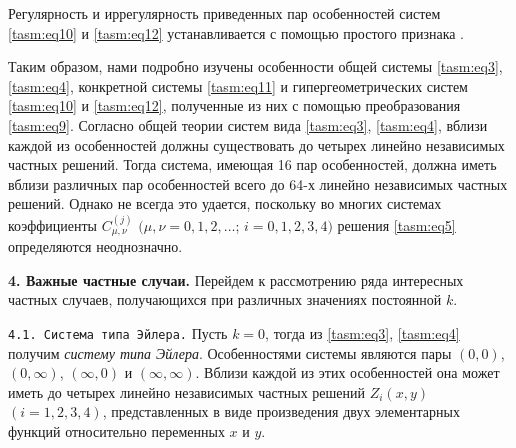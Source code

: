 Регулярность и иррегулярность приведенных пар особенностей систем \eqref{tasm:eq10} и \eqref{tasm:eq12} устанавливается с помощью простого признака \cite{tasm:4}. 

Таким образом, нами подробно изучены особенности общей системы \eqref{tasm:eq3}, \eqref{tasm:eq4}, конкретной системы \eqref{tasm:eq11} и гипергеометрических систем \eqref{tasm:eq10} и \eqref{tasm:eq12}, полученные из них с помощью преобразования \eqref{tasm:eq9}.
Согласно общей теории систем вида \eqref{tasm:eq3},  \eqref{tasm:eq4},  вблизи каждой из особенностей должны существовать до четырех линейно независимых частных решений. 
Тогда система, имеющая 16 пар особенностей, должна иметь вблизи различных пар особенностей всего до 64-х линейно независимых частных решений. Однако не всегда это удается, поскольку во многих системах коэффициенты 
$C^{(j)}_{\mu,\nu}$ $(\mu,\nu=0, 1, 2, \dots$; $i=0, 1, 2, 3, 4)$
решения \eqref{tasm:eq5} определяются неоднозначно.

\smallskip

\textbf{4.  Важные частные случаи.} 
Перейдем к рассмотрению ряда интересных частных случаев, получающихся при различных значениях
постоянной $k$.

\smallskip

\texttt{4.1. Система типа Эйлера.}  
Пусть $k=0$, тогда из \eqref{tasm:eq3}, \eqref{tasm:eq4} получим \emph{систему типа Эйлера}. 
Особенностями системы являются пары $(0, 0)$, $(0, \infty)$, $(\infty, 0)$ и $(\infty, \infty)$. 
Вблизи каждой из этих особенностей она может иметь до четырех линейно независимых частных решений $Z_{i}(x,y)$ $(i=1, 2, 3, 4)$,
представленных в виде произведения двух элементарных функций относительно переменных $x$ и $y$.

\smallskip

